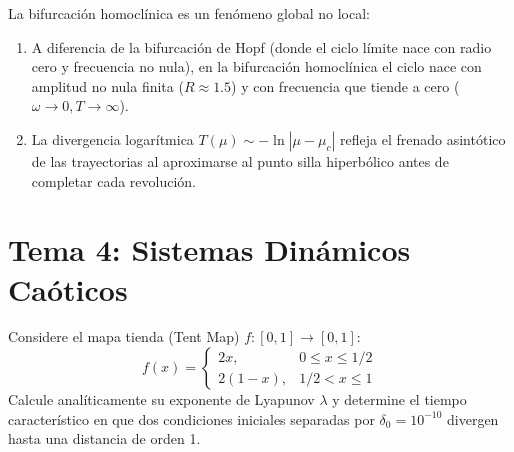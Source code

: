 \documentclass[11pt,a4paper]{article}
\newenvironment{solucion}[1][Solución Detallada]{%
    \vspace{1.5mm}%
    \noindent{\large\textbf{Solución:}}\par\vspace{1.5mm}%
}{%
    \par\vspace{3mm}%
}
\newenvironment{conclusion}[1][Interpretación Dinámica y Conclusión]{%
    \vspace{2mm}%
    \noindent{\large\textbf{Conclusión:}}\par\vspace{1.5mm}%
}{%
    \par\vspace{3mm}%
}
\begin{document}
\begin{solucion}
\begin{center}
\end{center}

\end{solucion}

\begin{conclusion}
La bifurcación homoclínica es un fenómeno global no local:
\begin{enumerate}
    \item A diferencia de la bifurcación de Hopf (donde el ciclo límite nace con radio cero y frecuencia no nula), en la bifurcación homoclínica el ciclo nace con amplitud no nula finita ($R \approx 1.5$) y con frecuencia que tiende a cero ($\omega \to 0, T \to \infty$).
    \item La divergencia logarítmica $T(\mu) \sim -\ln|\mu - \mu_c|$ refleja el frenado asintótico de las trayectorias al aproximarse al punto silla hiperbólico antes de completar cada revolución.
\end{enumerate}
\end{conclusion}

\vspace{5mm}
\section*{\color{unmsmblue} Tema 4: Sistemas Dinámicos Caóticos}

\begin{problema}[Problema 4.1]
Considere el mapa tienda (Tent Map) $f: [0, 1] \to [0, 1]$:
\[
f(x) = \begin{cases} 2x, & 0 \le x \le 1/2 \\ 2(1-x), & 1/2 < x \le 1 \end{cases}
\]
Calcule analíticamente su exponente de Lyapunov $\lambda$ y determine el tiempo característico en que dos condiciones iniciales separadas por $\delta_0 = 10^{-10}$ divergen hasta una distancia de orden 1.
\end{problema}
\end{document}
